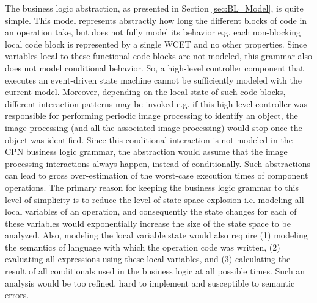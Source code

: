 The business logic abstraction, as presented in Section \ref{sec:BL_Model}, is quite simple. This model represents abstractly how long the different blocks of code in an operation take, but does not fully model its behavior e.g. each non-blocking local code block is represented by a single WCET and no other properties. Since variables local to these functional code blocks are not modeled, this grammar also does not model conditional behavior. So, a high-level controller component that executes an event-driven state machine cannot be sufficiently modeled with the current model. Moreover, depending on the local state of such code blocks, different interaction patterns may be invoked e.g. if this high-level controller was responsible for performing periodic image processing to identify an object, the image processing (and all the associated image processing) would stop once the object was identified. Since this conditional interaction is not modeled in the CPN business logic grammar, the abstraction would assume that the image processing interactions always happen, instead of conditionally. Such abstractions can lead to gross over-estimation of the worst-case execution times of component operations. The primary reason for keeping the business logic grammar to this level of simplicity is to reduce the level of state space explosion i.e. modeling all local variables of an operation, and consequently the state changes for each of these variables would exponentially increase the size of the state space to be analyzed. Also, modeling the local variable state would also require (1) modeling the semantics of language with which the operation code was written, (2) evaluating all expressions using these local variables, and (3) calculating the result of all conditionals used in the business logic at all possible times. Such an analysis would be too refined, hard to implement and susceptible to semantic errors. 



